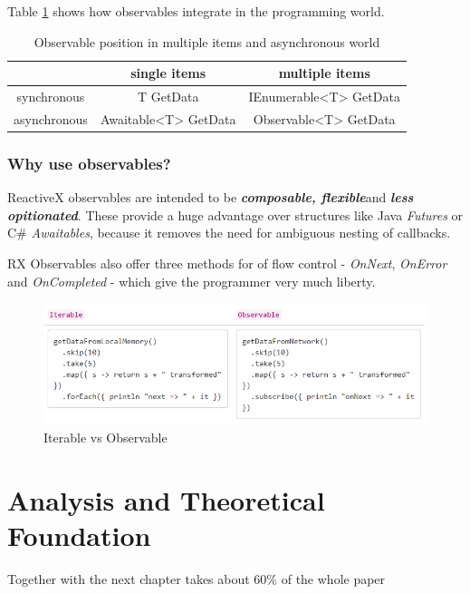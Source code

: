 \documentclass[12pt,a4paper,twoside]{report}
\begin{document}
Table \ref{table:rx} shows how observables integrate in the programming world.

\begin{table}[h]
  \centering
  \begin{tabular}{c | c | c}
    & single items & multiple items \\
    \hline
    synchronous & T GetData & IEnumerable<T> GetData \\
    asynchronous & Awaitable<T> GetData & Observable<T> GetData
  \end{tabular}
  \caption{Observable position in multiple items and asynchronous world}
  \label{table:rx}
\end{table}

\subsection{Why use observables?}
ReactiveX observables are intended to be \textbf{\textit{composable, flexible}}and \textbf{\textit{less opitionated}}. These provide a huge advantage over structures like Java \textit{Futures} or C\# \textit{Awaitables}, because it removes the need for ambiguous nesting of callbacks.

RX Observables also offer three methods for of flow control - \textit{OnNext}, \textit{OnError} and \textit{OnCompleted} - which give the programmer very much liberty.

\begin{figure}[h]
  \centering
  \includegraphics[width=\textwidth]{img/RX_iterable_vs_observable.PNG}
  \caption{Iterable vs Observable}
  \label{fig:rx_obs_it}
\end{figure}



\chapter{Analysis and Theoretical Foundation}
\label{ch:analysis}

Together with the next chapter takes about 60\% of the whole paper
\end{document}
